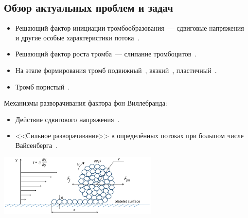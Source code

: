 \documentclass[
    14pt,
    xcolor=dvipsnames,
    aspectratio=169
]{beamer}
\begin{document}
\subsection{Обзор актуальных проблем и задач}

\begin{frame}{\subsecname}
    \begin{itemize}
        \item Решающий фактор инициации тромбообразования~---
            сдвиговые напряжения и другие особые характеристики потока~\cite{lauren2015high_shear_rate_thrombosis, avtaeva2022vWF}.
        \item Решающий фактор роста тромба~--- слипание тромбоцитов~\cite{rasche2001haemostasis_overview, lauren2015high_shear_rate_thrombosis, mereuta2021white_clots}.
        \item На этапе формирования тромб подвижный~\cite{savage1996platelet_adhesion,jamiolkowski2016visualization},
            вязкий~\cite{jamiolkowski2016visualization},
            пластичный~\cite{jamiolkowski2016visualization}.
        \item Тромб пористый~\cite{wufsus2013clot_permeability}.
    \end{itemize}
\end{frame}

\begin{frame}{\subsecname}
    Механизмы разворачивания фактора фон Виллебранда:
    \begin{itemize}
        \item Действие сдвигового напряжения~\cite{lippok2016vWF_unfolding, schneider2007vWF_unfolding, zlobina2016vWF_unfolding, pushin2020vWF_unfolding}.
        \item<1-> <<Сильное разворачивание>> в определённых потоках при большом числе Вайсенберга~\cite{zhussupbekov2021vWF_unfolding}.
    \end{itemize}
    \begin{center}
        \includegraphics[width=0.6\textwidth]{./images/slides/vWF_unfolding.png}
    \end{center}
\end{frame}
\end{document}
